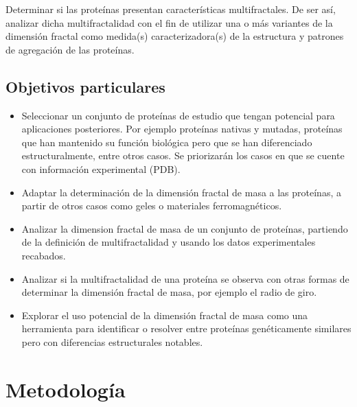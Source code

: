 \documentclass[11pt]{article}
\begin{document}
Determinar si las prote\'{i}nas presentan caracter\'{i}sticas multifractales. De ser as\'{i}, analizar
dicha multifractalidad con el fin de utilizar una o m\'{a}s variantes de la
dimensi\'{o}n fractal como medida(s) caracterizadora(s)
de la estructura y patrones de agregaci\'{o}n de las prote\'{i}nas.


\subsection{Objetivos particulares}

\begin{itemize}

\item Seleccionar un conjunto de prote\'{i}nas de estudio que tengan potencial para aplicaciones posteriores.
Por ejemplo prote\'{i}nas nativas y mutadas, prote\'{i}nas que han mantenido su funci\'{o}n biol\'{o}gica pero que se
han diferenciado estructuralmente, entre otros casos. Se priorizar\'{a}n los casos en que se cuente con informaci\'{o}n
experimental (PDB).

\item Adaptar la determinaci\'{o}n de la dimensi\'{o}n fractal de masa a las prote\'{i}nas, a partir de otros casos como geles o materiales ferromagn\'{e}ticos.

\item Analizar la dimension fractal de masa de un conjunto de prote\'{i}nas, partiendo de la definici\'{o}n de multifractalidad y usando los datos experimentales recabados.

\item Analizar si la multifractalidad de una prote\'{i}na se observa con otras formas de determinar la
dimensi\'{o}n fractal de masa, por ejemplo el radio de giro.

\item Explorar el uso potencial de la dimensi\'{o}n fractal de masa como una herramienta para identificar
o resolver entre prote\'{i}nas gen\'{e}ticamente similares pero con diferencias estructurales notables.

\end{itemize}

\clearpage

\section{Metodolog\'{i}a}
\end{document}
